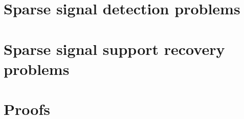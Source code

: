 \section{Sparse signal detection problems}
\label{sec:global-tests}



\section{Sparse signal support recovery problems}
\label{sec:additive-error-model-boundaries}



\section{Proofs}
\label{sec:proofs}







